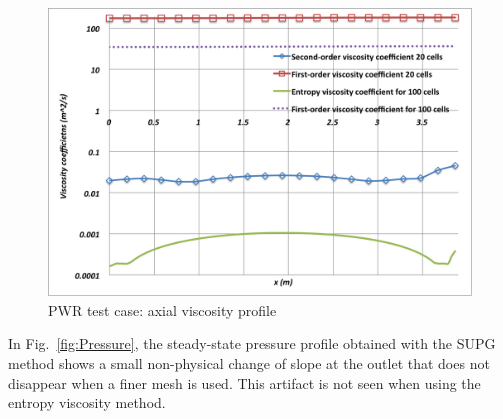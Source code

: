 \documentclass[12pt]{article}
\newcommand{\fig}[1]{Fig.~\ref{#1}} %
\begin{document}
\begin{figure}[h]
\centering
\includegraphics[scale=0.4]{plots/Viscosity.png}
\caption{PWR test case: axial viscosity profile}
\label{fig:Viscosity}
\end{figure}
In \fig{fig:Pressure}, the steady-state pressure profile obtained with the SUPG method shows a small non-physical change of slope at the outlet that does not disappear when a finer mesh is used. This artifact is not seen when using the entropy viscosity method. \\
\end{document}
